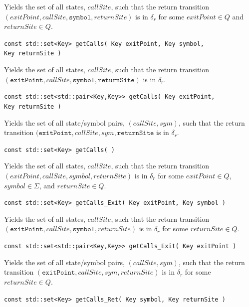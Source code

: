 \documentclass{llncs}
\begin{document}
\begin{description}
    Yields the set of all states, $callSite$, such that the return transition
    $(exitPoint,callSite,\texttt{symbol},returnSite)$ is in $\delta_r$ for
    some $exitPoint \in Q$ and $returnSite \in Q$.

  \item\texttt{const std::set<Key> getCalls( Key exitPoint, Key symbol,\\ \hspace*{3.25cm} Key returnSite )} \nopagebreak

    Yields the set of all states, $callSite$, such that the return transition
    $(\texttt{exitPoint},callSite,\texttt{symbol},\texttt{returnSite})$ is in
    $\delta_r$.

  \item\texttt{const std::set<std::pair<Key,Key>> getCalls( Key exitPoint,\\ \hspace*{3.25cm} Key returnSite )} \nopagebreak

    Yields the set of all state/symbol pairs, $(callSite,sym)$, such that the
    return transition $(\texttt{exitPoint},callSite,sym,\texttt{returnSite}$
    is in $\delta_r$.

  \item\texttt{const std::set<Key> getCalls( )} \nopagebreak

    Yields the set of all states, $callSite$, such that the return transition
    $(exitPoint,callSite,symbol,returnSite)$ is in $\delta_r$ for some
    $exitPoint \in Q$, $symbol \in \Sigma$, and $returnSite \in Q$.

  \item\texttt{const std::set<Key> getCalls\_Exit( Key exitPoint, Key symbol )} \nopagebreak

    Yields the set of all states, $callSite$, such that the return transition
    $(\texttt{exitPoint},callSite,\texttt{symbol},returnSite)$ is in
    $\delta_r$ for some $returnSite \in Q$.

  \item\texttt{const std::set<std::pair<Key,Key>> getCalls\_Exit( Key exitPoint )} \nopagebreak

    Yields the set of all state/symbol pairs, $(callSite,sym)$, such that the
    return transition $(\texttt{exitPoint},callSite,sym,returnSite)$ is in
    $\delta_r$ for some $returnSite \in Q$.

  \item\texttt{const std::set<Key> getCalls\_Ret( Key symbol, Key returnSite )} \nopagebreak


\end{description}
\end{document}
